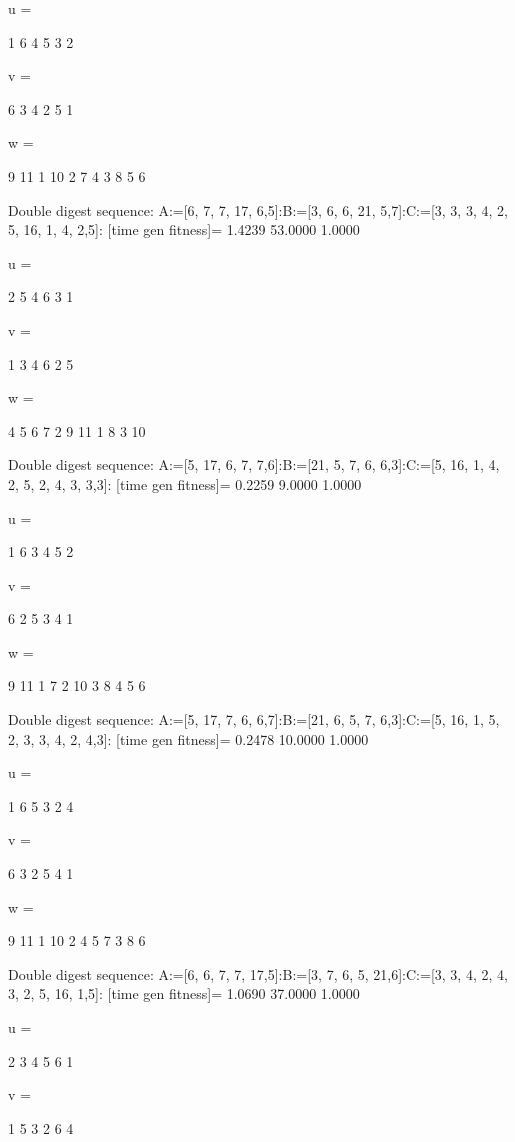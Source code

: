 u =

     1     6     4     5     3     2


v =

     6     3     4     2     5     1


w =

     9    11     1    10     2     7     4     3     8     5     6

Double digest sequence:
A:=[6, 7, 7, 17, 6,5]:B:=[3, 6, 6, 21, 5,7]:C:=[3, 3, 3, 4, 2, 5, 16, 1, 4, 2,5]:
[time gen fitness]=
    1.4239   53.0000    1.0000


u =

     2     5     4     6     3     1


v =

     1     3     4     6     2     5


w =

     4     5     6     7     2     9    11     1     8     3    10

Double digest sequence:
A:=[5, 17, 6, 7, 7,6]:B:=[21, 5, 7, 6, 6,3]:C:=[5, 16, 1, 4, 2, 5, 2, 4, 3, 3,3]:
[time gen fitness]=
    0.2259    9.0000    1.0000


u =

     1     6     3     4     5     2


v =

     6     2     5     3     4     1


w =

     9    11     1     7     2    10     3     8     4     5     6

Double digest sequence:
A:=[5, 17, 7, 6, 6,7]:B:=[21, 6, 5, 7, 6,3]:C:=[5, 16, 1, 5, 2, 3, 3, 4, 2, 4,3]:
[time gen fitness]=
    0.2478   10.0000    1.0000


u =

     1     6     5     3     2     4


v =

     6     3     2     5     4     1


w =

     9    11     1    10     2     4     5     7     3     8     6

Double digest sequence:
A:=[6, 6, 7, 7, 17,5]:B:=[3, 7, 6, 5, 21,6]:C:=[3, 3, 4, 2, 4, 3, 2, 5, 16, 1,5]:
[time gen fitness]=
    1.0690   37.0000    1.0000


u =

     2     3     4     5     6     1


v =

     1     5     3     2     6     4


